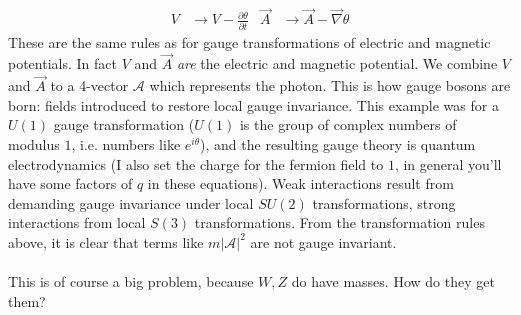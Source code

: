 \begin{align}
    V & \to V -  \frac{\partial \theta}{\partial t}
    &
    \vec{A} & \to \vec{A} - \vec{\nabla}{\theta}
\end{align}
These are the same rules as for gauge transformations of electric and magnetic potentials. In fact $V$ and $\vec{A}$ \emph{are} the electric and magnetic potential. We combine $V$ and $\vec{A}$ to a 4-vector $\mathcal{A}$ which represents the photon. This is how gauge bosons are born: fields introduced to restore local gauge invariance. This example was for a $U(1)$ gauge transformation ($U(1)$ is the group of complex numbers of modulus $1$, i.e. numbers like $e^{i\theta}$), and the resulting gauge theory is quantum electrodynamics (I also set the charge for the fermion field to $1$, in general you'll have some factors of $q$ in these equations). Weak interactions result from demanding gauge invariance under local $SU(2)$ transformations, strong interactions from local $S(3)$ transformations. From the transformation rules above, it is clear that terms like $m|\mathcal{A}|^2$ are not gauge invariant.
\\\\
This is of course a big problem, because $W, Z$ do have masses. How do they get them?

